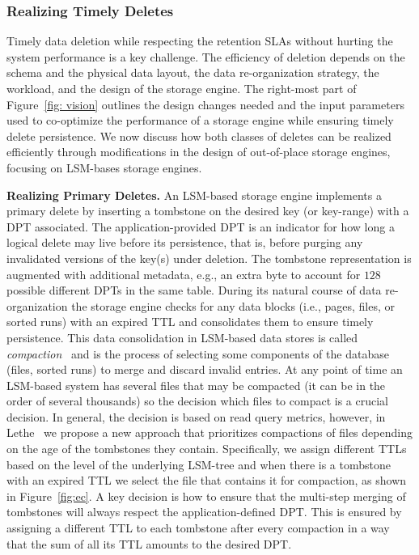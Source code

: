 \documentclass[11pt,dvipdfmx]{article}
\newcommand\Paragraph[1]{\vspace{0.02in}  \noindent \textbf{#1.}}
\begin{document}
\subsubsection{Realizing Timely Deletes}
Timely data deletion while respecting the retention SLAs without hurting the system 
performance is a key challenge. The efficiency of deletion depends on the schema and 
the physical data layout, the data re-organization strategy, the workload, and the 
design of the storage engine. The right-most part of Figure~\ref{fig: vision}
outlines the design changes needed and the input parameters used to co-optimize the 
performance of a storage engine while ensuring timely delete persistence. We
now discuss how both classes of deletes can be realized efficiently through 
modifications in the design of out-of-place storage engines, focusing on 
LSM-bases storage engines.

\Paragraph{Realizing Primary Deletes}
An LSM-based storage engine implements a primary delete by inserting a tombstone
on the desired key (or key-range) with a DPT associated. The application-provided
DPT is an indicator for how long a logical delete may live before its persistence,
that is, before purging any invalidated versions of the key(s) under deletion. The
tombstone representation is augmented with additional metadata, e.g., an extra byte 
to account for $128$ possible different DPTs in the same table. 
During its natural course of data re-organization the storage engine checks for any 
data blocks (i.e., pages, files, or sorted runs) with an expired TTL and 
consolidates them to ensure timely persistence. This data consolidation in LSM-based
data stores is called \emph{compaction}~\cite{Sarkar2022a,Sarkar2021c} and is the process of
selecting some components of the database (files, sorted runs) to merge and discard
invalid entries. At any point of time an LSM-based system has several files that 
may be compacted (it can be in the order of several thousands) so the decision which files to 
compact is a crucial decision. In general, the decision is based on read query 
metrics, however, in Lethe~\cite{Sarkar2020} we propose a new approach that 
prioritizes compactions of files depending on the age of the tombstones they contain.
Specifically, we assign different TTLs based on the level of the underlying LSM-tree 
and when there is a tombstone with an expired TTL we select the file that contains
it for compaction, as shown in Figure~\ref{fig:ec}. A key decision is how to ensure
that the multi-step merging of tombstones will always respect the 
application-defined DPT. This is ensured by assigning a different TTL to each 
tombstone after every compaction in a way that the sum of all its TTL amounts to the 
desired DPT. 
\end{document}
